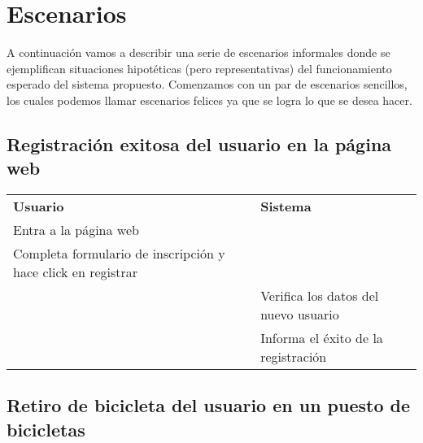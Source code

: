 \documentclass[a4paper, 11pt, spanish]{article}
\begin{document}
\newpage
\section{Escenarios}
A continuación vamos a describir una serie de escenarios informales donde se ejemplifican situaciones hipotéticas (pero representativas) del funcionamiento esperado del sistema propuesto.
Comenzamos con un par de escenarios sencillos, los cuales podemos llamar escenarios felices ya que se logra lo que se desea hacer.

\subsection{Registración exitosa del usuario en la página web}

\begingroup
    \fontsize{8pt}{12pt}\selectfont

\begin{tabular}{|p{7cm}|p{7cm}|}
\cline{1-2}
\textbf{Usuario} & \textbf{Sistema} \\ \cline{1-2}
Entra a la página web & \\ \cline{1-2}
Completa formulario de inscripción y hace click en registrar& \\ \cline{1-2}
 &Verifica los datos del nuevo usuario \\ \cline{1-2}
 &Informa el éxito de la registración\\ \cline{1-2}
\end{tabular}

\endgroup

\subsection{Retiro de bicicleta del usuario en un puesto de bicicletas}

\begingroup
    \fontsize{8pt}{12pt}\selectfont
\end{document}
